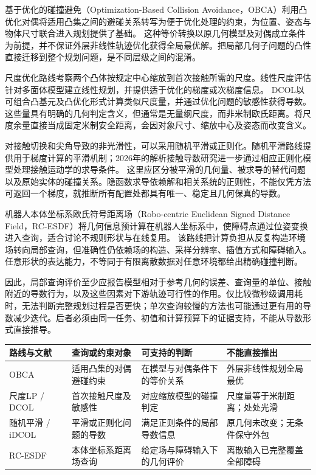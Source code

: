 \documentclass{aas}
\begin{document}
基于优化的碰撞避免（Optimization-Based Collision Avoidance，OBCA）利用凸优化对偶将适用凸集之间的避碰关系转写为便于优化处理的约束，为位置、姿态与物体尺寸联合进入规划提供了基础。\cite{R04} 这种等价转换以原几何模型及对偶成立条件为前提，并不保证外层非线性轨迹优化获得全局最优解。把局部几何子问题的凸性直接迁移到整个规划问题，是不同层级之间的混淆。

尺度优化路线考察两个凸体按规定中心缩放到首次接触所需的尺度。线性尺度评估针对多面体模型建立线性规划，并提供适于优化的梯度或次梯度信息。\cite{R01} DCOL以可组合凸基元及凸优化形式计算类似尺度量，并通过优化问题的敏感性获得导数。\cite{R05} 这些量具有明确的几何判定含义，但通常是无量纲尺度，而非米制欧氏距离。将尺度余量直接当成固定米制安全距离，会因对象尺寸、缩放中心及姿态而改变含义。

对接触切换和尖角导致的非光滑性，可以采用随机平滑或正则化。随机平滑路线提供用于梯度计算的平滑机制；2026年的解析接触导数研究进一步通过相应正则化模型处理接触运动学的求导条件。\cite{R06}\cite{R16} 这里应区分被平滑的几何量、被求导的替代问题以及原始实体的碰撞关系。隐函数求导依赖解和相关系统的正则性，不能仅凭方法可返回一个梯度，就推断所有配置处都具有唯一、稳定且几何保真的导数。

机器人本体坐标系欧氏符号距离场（Robo-centric Euclidean Signed Distance Field，RC-ESDF）将几何信息预计算在机器人坐标系中，使障碍点通过位姿变换进入查询，适合讨论不规则形状与在线复用。\cite{R07} 该路线把计算负担从反复构造环境场转向局部查询，但准确性仍依赖场的构造、采样分辨率、插值方式和障碍输入。任意形状的表达能力，不等同于有限离散数据对任意环境都给出精确碰撞判断。

因此，局部查询评价至少应报告模型相对于参考几何的误差、查询量的单位、接触附近的导数行为，以及这些因素对下游轨迹可行性的作用。仅比较微秒级调用耗时，无法判断完整规划过程是否更快；单次查询较慢的方法也可能通过更有用的导数减少迭代。后者必须由同一任务、初值和计算预算下的证据支持，不能从导数形式直接推导。

\begin{table}[t]
\centering
{}
\small\setlength{\tabcolsep}{3pt}
\begin{tabular}{>{\raggedright\arraybackslash}p{}>{\raggedright\arraybackslash}p{}>{\raggedright\arraybackslash}p{}>{\raggedright\arraybackslash}p{}}
\toprule
路线与文献 & 查询或约束对象 & 可支持的判断 & 不能直接推出\\
\midrule
OBCA \cite{R04} & 适用凸集的对偶避碰约束 & 在模型与对偶条件下的等价关系 & 外层非线性规划全局最优\\
尺度LP / DCOL \cite{R01}\cite{R05} & 首次接触尺度及敏感性 & 对应缩放模型的碰撞判定 & 尺度量等于米制距离；处处光滑\\
随机平滑 / iDCOL \cite{R06}\cite{R16} & 平滑或正则化问题的导数 & 满足正则条件的局部导数信息 & 原几何未改变；无条件保守外包\\
RC-ESDF \cite{R07} & 本体坐标系距离场查询 & 给定场与障碍输入下的几何评价 & 离散输入已完整覆盖全部障碍\\
\bottomrule
\end{tabular}
\end{table}
\end{document}
